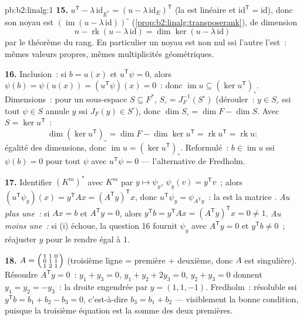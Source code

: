 \begin{solution}{pb:b2:linalg:1}
\textbf{15.} $u^{\mathsf T} - \lambda\,\mathrm{id}_{E^*} = (u -
\lambda\,\mathrm{id}_E)^{\mathsf T}$ (la  est linéaire et
$\mathrm{id}^{\mathsf T} = \mathrm{id}$), donc son noyau est
$(\operatorname{im}(u - \lambda\,\mathrm{id}))^\circ$
(\cref{prop:b2:linalg:transposerank}), de dimension
\[
n - \operatorname{rk}(u - \lambda\,\mathrm{id})
= \dim\ker(u - \lambda\,\mathrm{id})
\]
par le théorème du rang. En particulier un noyau est non nul ssi
l'autre l'est~: mêmes valeurs propres, mêmes multiplicités géométriques.

\textbf{16.} Inclusion~: si $b = u(x)$ et $u^{\mathsf T}\psi =
0$, alors $\psi(b) = \psi(u(x)) = (u^{\mathsf T}\psi)(x) = 0$~: donc
$\operatorname{im} u \subseteq (\ker u^{\mathsf T})_\circ$.
Dimensions~: pour un sous-espace $S \subseteq F^*$, $S_\circ =
J_F^{-1}(S^\circ)$ (dérouler~: $y \in S_\circ$ ssi tout $\psi \in
S$ annule $y$ ssi $J_F(y) \in S^\circ$), donc $\dim S_\circ = \dim
F - \dim S$. Avec $S = \ker u^{\mathsf T}$~:
\[
\dim(\ker u^{\mathsf T})_\circ
= \dim F - \dim\ker u^{\mathsf T}
= \operatorname{rk} u^{\mathsf T} = \operatorname{rk} u :
\]
égalité des dimensions, donc $\operatorname{im} u = (\ker
u^{\mathsf T})_\circ$. Reformulé~: $b \in \operatorname{im} u$ ssi
$\psi(b) = 0$ pour tout $\psi$ avec $u^{\mathsf T}\psi = 0$ ---
l'alternative de Fredholm.

\textbf{17.} Identifier $(K^m)^*$ avec $K^m$ par $y \mapsto \psi_y$,
$\psi_y(v) = y^{\mathsf T}v$~; alors $(u^{\mathsf T}\psi_y)(x) =
y^{\mathsf T}Ax = (A^{\mathsf T}y)^{\mathsf T}x$, donc $u^{\mathsf
T}\psi_y = \psi_{A^{\mathsf T}y}$~: la  est la matrice
. \emph{Au plus une~:} si $Ax = b$ et
$A^{\mathsf T}y = 0$, alors $y^{\mathsf T}b = y^{\mathsf T}Ax =
(A^{\mathsf T}y)^{\mathsf T}x = 0 \neq 1$. \emph{Au moins une~:}
si (i) échoue, la question 16 fournit $\psi_y$ avec $A^{\mathsf T}y
= 0$ et $y^{\mathsf T}b \neq 0$~; réajuster $y$ pour le rendre égal à $1$.

\textbf{18.} $A = \begin{psmallmatrix} 1 & 1 & 0\\ 0 & 1 & 1\\
1 & 2 & 1\end{psmallmatrix}$ (troisième ligne = première + deuxième, donc $A$
est singulière). Résoudre $A^{\mathsf T}y = 0$~: $y_1 + y_3 = 0$, $y_1
+ y_2 + 2y_3 = 0$, $y_2 + y_3 = 0$ donnent $y_1 = y_2 = -y_3$~: la
droite engendrée par $y = (1, 1, -1)$. Fredholm~: résoluble ssi
$y^{\mathsf T}b = b_1 + b_2 - b_3 = 0$, c'est-à-dire $b_3 = b_1 + b_2$
--- visiblement la bonne condition, puisque la troisième équation est la
somme des deux premières.


\end{solution}
